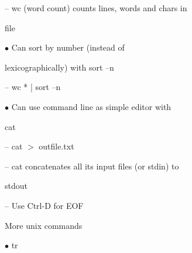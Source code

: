 \documentclass[a4paper,portrait,12pt]{article}
\begin{document}
\begin{flushleft}
-- wc (word count) counts lines, words and chars in
\end{flushleft}


\begin{flushleft}
file
\end{flushleft}





\begin{flushleft}
$\bullet$ Can sort by number (instead of
\end{flushleft}


\begin{flushleft}
lexicographically) with sort --n
\end{flushleft}


\begin{flushleft}
-- wc * | sort --n
\end{flushleft}





\begin{flushleft}
$\bullet$ Can use command line as simple editor with
\end{flushleft}


\begin{flushleft}
cat
\end{flushleft}


\begin{flushleft}
-- cat $>$ outfile.txt
\end{flushleft}


\begin{flushleft}
-- cat concatenates all its input files (or stdin) to
\end{flushleft}


\begin{flushleft}
stdout
\end{flushleft}


\begin{flushleft}
-- Use Ctrl-D for EOF
\end{flushleft}





\begin{flushleft}
\newpage
More unix commands
\end{flushleft}


\begin{flushleft}
$\bullet$ tr
\end{flushleft}
\end{document}
